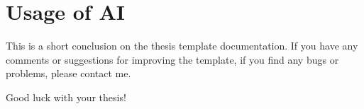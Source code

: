 \chapter{Usage of AI}
This is a short conclusion on the thesis template documentation. If you have any comments or suggestions for improving the template, if you find any bugs or problems, please contact me. 

\vspace{2cm}

Good luck with your thesis!

